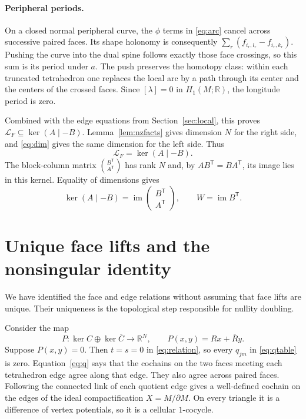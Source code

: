 \documentclass[11pt]{article}
\theoremstyle{definition}\newtheorem{definition}[theorem]{Definition}
\theoremstyle{remark}\newtheorem{remark}[theorem]{Remark}
\DeclareMathOperator{\im}{im}
\newcommand{\R}{\mathbb R}
\newcommand{\Ct}{\overline C}
\newcommand{\Rt}{\overline R}
\begin{document}
\paragraph{Peripheral periods.}
On a closed normal peripheral curve, the $\phi$ terms in
\eqref{eq:arc} cancel across successive paired faces. Its shape
holonomy is consequently $\sum_r(f_{i_r,l_r}-f_{i_r,k_r})$. Pushing the
curve into the dual spine follows exactly those face crossings, so
this sum is its period under $a$. The push preserves the homotopy
class: within each truncated tetrahedron one replaces the local arc
by a path through its center and the centers of the crossed faces.
Since $[\lambda]=0$ in $H_1(M;\R)$, the longitude period is zero.

Combined with the edge equations from Section~\ref{sec:local}, this
proves $\mathcal L_F\subseteq\ker(A\mid-B)$. Lemma~\ref{lem:nzfacts}
gives dimension $N$ for the right side, and \eqref{eq:dim} gives the
same dimension for the left side. Thus
\begin{equation}
\mathcal L_F=\ker(A\mid-B).
\label{eq:duality}
\end{equation}
The block-column matrix $\binom{B^{\mathsf T}}{A^{\mathsf T}}$ has rank
$N$ and, by $AB^{\mathsf T}=BA^{\mathsf T}$, its image lies in this
kernel. Equality of dimensions gives
\[
\ker(A\mid-B)=\im\begin{pmatrix}B^{\mathsf T}\\A^{\mathsf T}\end{pmatrix},
\qquad W=\im B^{\mathsf T}.
\]

\section{Unique face lifts and the nonsingular identity}\label{sec:factor-two}\label{sec:injectivity}
We have identified the face and edge relations without assuming that
face lifts are unique. Their uniqueness is the topological step
responsible for nullity doubling.

Consider the map
\[
P:\ker C\oplus\ker\Ct\longrightarrow\R^N,
\qquad P(x,y)=Rx+\Rt y.
\]
Suppose $P(x,y)=0$. Then $t=s=0$ in \eqref{eq:relation}, so every
$q_{jm}$ in \eqref{eq:qtable} is zero. Equation~\eqref{eq:q} says that
the cochains on the two faces meeting each tetrahedron edge agree
along that edge. They also agree across paired faces. Following the
connected link of each quotient edge gives a well-defined cochain on
the edges of the ideal compactification $X=M/\partial M$. On every
triangle it is a difference of vertex potentials, so it is a cellular
$1$-cocycle.
\end{document}
